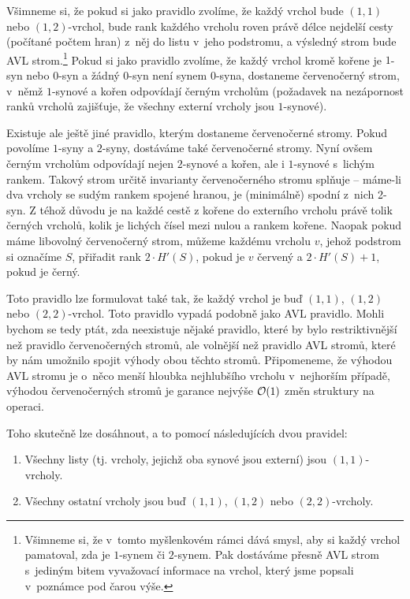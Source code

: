 \def\nezlom{\hbox{-}}
Všimneme si, že pokud si jako pravidlo zvolíme, že každý vrchol bude $(1,1)$
nebo $(1,2)$\nezlom vrchol, bude rank každého vrcholu roven právě délce nejdelší cesty
(počítané počtem hran) z~něj do listu v~jeho podstromu, a výsledný strom bude
AVL strom.\footnote{Všimneme si, že v~tomto myšlenkovém rámci dává smysl, aby si každý vrchol pamatoval, zda je $1$\nezlom synem či $2$\nezlom synem. Pak dostáváme přesně AVL strom s~jediným bitem vyvažovací informace na vrchol, který jsme popsali v~poznámce pod čarou výše.} Pokud si jako pravidlo zvolíme, že každý vrchol kromě kořene je
$1$\nezlom syn nebo $0$\nezlom syn a žádný $0$\nezlom syn není synem $0$\nezlom syna, dostaneme
červenočerný strom, v~němž $1$\nezlom synové a kořen odpovídají černým vrcholům (požadavek na
nezápornost ranků vrcholů zajišťuje, že všechny externí vrcholy jsou
$1$\nezlom synové).

Existuje ale ještě jiné pravidlo, kterým dostaneme červenočerné stromy. Pokud
povolíme $1$\nezlom syny a $2$\nezlom syny, dostáváme také červenočerné stromy. Nyní ovšem
černým vrcholům odpovídají nejen $2$\nezlom synové a kořen, ale i $1$\nezlom synové s~lichým rankem.
Takový strom určitě invarianty červenočerného stromu splňuje -- máme-li dva
vrcholy se sudým rankem spojené hranou, je (minimálně) spodní z~nich 2\nezlom syn. Z téhož důvodu je na každé cestě z kořene do externího vrcholu právě tolik černých vrcholů, kolik je lichých čísel mezi nulou a rankem kořene. 
Naopak pokud máme libovolný červenočerný strom, můžeme každému vrcholu $v$, jehož
podstrom si označíme $S$, přiřadit rank $2\cdot H'(S)$, pokud je $v$ červený a
$2\cdot H'(S) + 1$, pokud je černý.

Toto pravidlo lze formulovat také tak, že každý vrchol je buď $(1,1)$, $(1,2)$ nebo $(2,2)$\nezlom vrchol. Toto pravidlo vypadá podobně jako AVL pravidlo. Mohli bychom se tedy ptát, zda neexistuje nějaké pravidlo, které by bylo restriktivnější než pravidlo červenočerných stromů, ale volnější než pravidlo AVL stromů, které by nám umožnilo spojit výhody obou těchto stromů. Připomeneme, že výhodou AVL stromu je o~něco menší hloubka nejhlubšího vrcholu v~nejhorším případě, výhodou červenočerných stromů je garance nejvýše $\mathcal O(1)$ změn struktury na operaci. 

Toho skutečně lze dosáhnout, a to pomocí následujících dvou pravidel:
\begin{enumerate}
\item Všechny listy (tj. vrcholy, jejichž oba synové jsou externí) jsou $(1,1)$\nezlom vrcholy.
\item Všechny ostatní vrcholy jsou buď $(1,1)$, $(1,2)$ nebo $(2,2)$\nezlom vrcholy.
\end{enumerate}

